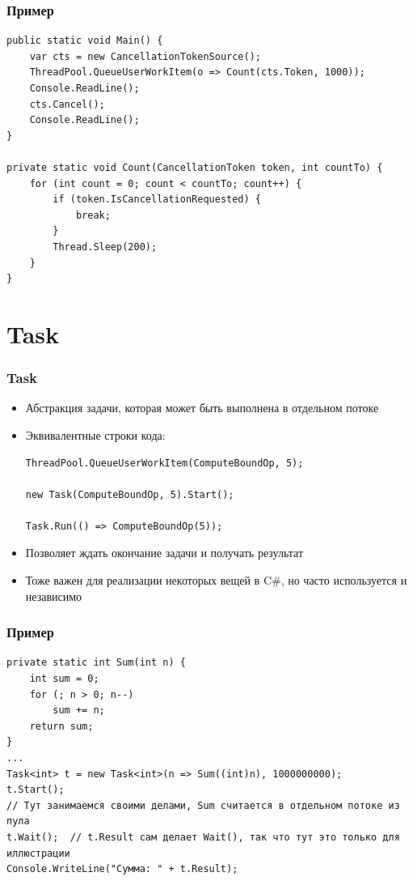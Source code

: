 \documentclass[xetex,mathserif,serif]{beamer}
\begin{document}
	\begin{frame}[fragile]
		\frametitle{Пример}
		\begin{small}
			\begin{verbatim}
public static void Main() {
    var cts = new CancellationTokenSource();
    ThreadPool.QueueUserWorkItem(o => Count(cts.Token, 1000));
    Console.ReadLine();
    cts.Cancel();
    Console.ReadLine();
}

private static void Count(CancellationToken token, int countTo) {
    for (int count = 0; count < countTo; count++) {
        if (token.IsCancellationRequested) {
            break;
        }
        Thread.Sleep(200); 
    }
}
			\end{verbatim}
		\end{small}
	\end{frame}

	\section{Task}

	\begin{frame}[fragile]
		\frametitle{Task}
		\begin{itemize}
			\item Абстракция задачи, которая может быть выполнена в отдельном потоке
			\item Эквивалентные строки кода:
				\begin{verbatim}
ThreadPool.QueueUserWorkItem(ComputeBoundOp, 5);

new Task(ComputeBoundOp, 5).Start();

Task.Run(() => ComputeBoundOp(5));
				\end{verbatim}
			\item Позволяет ждать окончание задачи и получать результат
			\item Тоже важен для реализации некоторых вещей в C\#, но часто используется и независимо
		\end{itemize}
	\end{frame}

	\begin{frame}[fragile]
		\frametitle{Пример}
		\begin{footnotesize}
			\begin{verbatim}
private static int Sum(int n) {
    int sum = 0;
    for (; n > 0; n--)
        sum += n;
    return sum;
}
...
Task<int> t = new Task<int>(n => Sum((int)n), 1000000000);
t.Start();
// Тут занимаемся своими делами, Sum считается в отдельном потоке из пула
t.Wait();  // t.Result сам делает Wait(), так что тут это только для иллюстрации
Console.WriteLine("Сумма: " + t.Result);
			\end{verbatim}
		\end{footnotesize}
	\end{frame}
\end{document}
